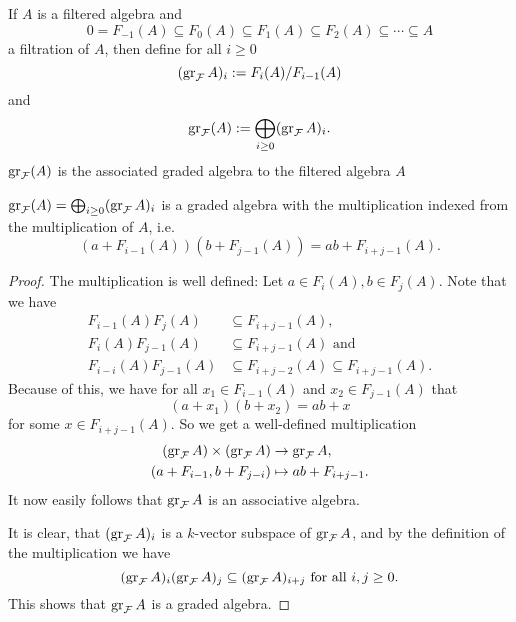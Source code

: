 \begin{defi}
 If $A$ is a filtered algebra and
 \[
  0 = F_{-1}(A) \subseteq F_0(A) \subseteq F_1(A) \subseteq F_2(A) \subseteq \dotsb \subseteq A
 \]
 a filtration of $A$, then define for all $i \geq 0$
 \[
  (\operatorname{gr}_\mathcal{F}A)_i := F_i(A)/F_{i-1}(A)
 \]
 and
 \[
  \operatorname{gr}_\mathcal{F}(A) := \bigoplus_{i \geq 0} (\operatorname{gr}_\mathcal{F}A)_i.
 \]
 $\operatorname{gr}_\mathcal{F}(A)$ is the associated graded algebra to the filtered algebra $A$
\end{defi}



\begin{lem}
 $\operatorname{gr}_\mathcal{F}(A) = \bigoplus_{i \geq 0} (\operatorname{gr}_\mathcal{F}A)_i$ is a graded algebra with the multiplication indexed from the multiplication of $A$, i.e.
 \[
  ( a + F_{i-1}(A) )( b + F_{j-1}(A) ) = ab + F_{i+j-1}(A).
 \]
\end{lem}
\begin{proof}
 The multiplication is well defined: Let $a \in F_i(A), b \in F_j(A)$. Note that we have
 \begin{align*}
  F_{i-1}(A)F_j(A) &\subseteq F_{i+j-1}(A), \\
  F_i(A) F_{j-1}(A) &\subseteq F_{i+j-1}(A) \text{ and } \\
  F_{i-i}(A)F_{j-1}(A) &\subseteq F_{i+j-2}(A) \subseteq F_{i+j-1}(A).
 \end{align*}
 Because of this, we have for all $x_1 \in F_{i-1}(A)$ and $x_2 \in F_{j-1}(A)$ that
 \[
  (a + x_1)(b + x_2) = a b + x
 \]
 for some $x \in F_{i+j-1}(A)$. So we get a well-defined multiplication
 \begin{align*}
  (\operatorname{gr}_\mathcal{F} A) \times (\operatorname{gr}_\mathcal{F} A) &\to \operatorname{gr}_\mathcal{F} A, \\
  (a + F_{i-1}, b + F_{j-i}) &\mapsto ab + F_{i+j-1}.
 \end{align*}
 It now easily follows that $\operatorname{gr}_\mathcal{F} A$ is an associative algebra.
 
 It is clear, that $(\operatorname{gr}_\mathcal{F} A)_i$ is a $k$-vector subspace of $\operatorname{gr}_\mathcal{F} A$, and by the definition of the multiplication we have
 \[
  (\operatorname{gr}_\mathcal{F} A)_i (\operatorname{gr}_\mathcal{F} A)_j \subseteq (\operatorname{gr}_\mathcal{F} A)_{i+j} \text{ for all } i,j \geq 0.
 \]
 This shows that $\operatorname{gr}_\mathcal{F} A$ is a graded algebra.
\end{proof}


